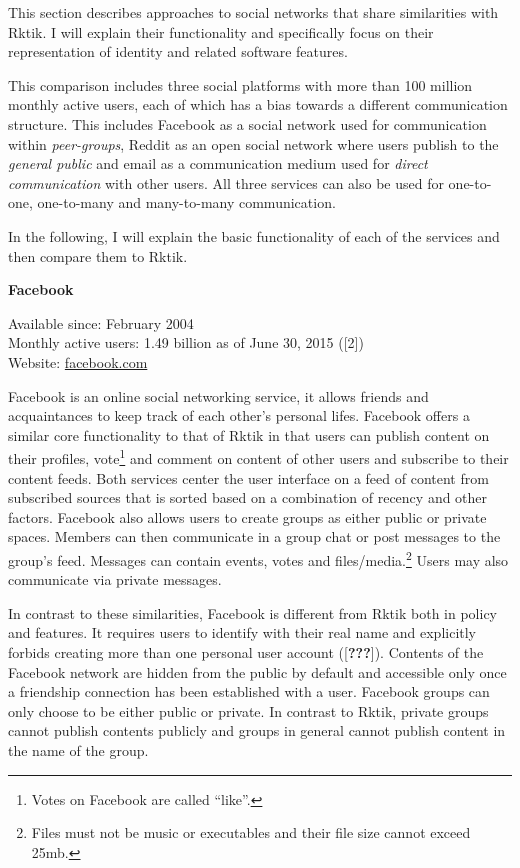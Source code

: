 
This section describes approaches to social networks that share
similarities with Rktik. I will explain their functionality and
specifically focus on their representation of identity and related
software features.

This comparison includes three social platforms with more than 100
million monthly active users, each of which has a bias towards a
different communication structure. This includes Facebook as a social
network used for communication within \emph{peer-groups}, Reddit as an
open social network where users publish to the \emph{general public} and
email as a communication medium used for \emph{direct communication}
with other users. All three services can also be used for one-to-one,
one-to-many and many-to-many communication.

In the following, I will explain the basic functionality of each of the
services and then compare them to Rktik.

\textbf{Facebook}

Available since: February 2004\\
Monthly active users: 1.49 billion as of June 30, 2015 ({[}2{]})\\
Website: \href{http://facebook.com/}{facebook.com}

Facebook is an online social networking service, it allows friends and
acquaintances to keep track of each other's personal lifes. Facebook
offers a similar core functionality to that of Rktik in that users can
publish content on their profiles, vote\footnote{Votes on Facebook are
  called ``like''.} and comment on content of other users and subscribe
to their content feeds. Both services center the user interface on a
feed of content from subscribed sources that is sorted based on a
combination of recency and other factors. Facebook also allows users to
create groups as either public or private spaces. Members can then
communicate in a group chat or post messages to the group's feed.
Messages can contain events, votes and files/media.\footnote{Files must
  not be music or executables and their file size cannot exceed 25mb.}
Users may also communicate via private messages.

In contrast to these similarities, Facebook is different from Rktik both
in policy and features. It requires users to identify with their real
name and explicitly forbids creating more than one personal user account
({[}{\textbf{???}}{]}). Contents of the Facebook network are hidden from
the public by default and accessible only once a friendship connection
has been established with a user. Facebook groups can only choose to be
either public or private. In contrast to Rktik, private groups cannot
publish contents publicly and groups in general cannot publish content
in the name of the group.


